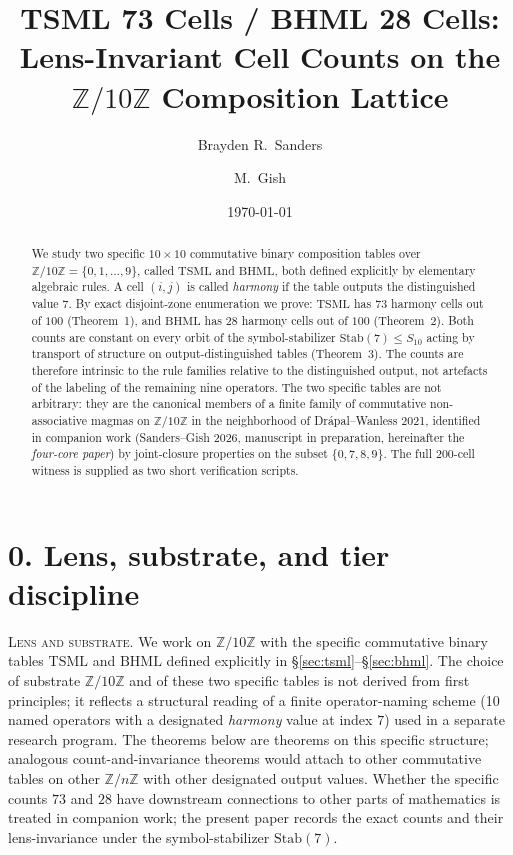 \documentclass[11pt,reqno]{amsart}
\title[TSML 73 / BHML 28 cells on $\Zten$]
  {TSML 73 Cells / BHML 28 Cells:\\
   Lens-Invariant Cell Counts on the\\
   $\mathbb{Z}/10\mathbb{Z}$ Composition Lattice}
\author{Brayden R.\ Sanders}
\author{M.\ Gish}
\date{\today}
\theoremstyle{plain}
\theoremstyle{definition}
\theoremstyle{remark}
\newcommand{\Z}{\mathbb{Z}}
\newcommand{\Zten}{\Z/10\Z}
\newcommand{\TSML}{\mathrm{TSML}}
\newcommand{\BHML}{\mathrm{BHML}}
\begin{document}
\begin{abstract}
We study two specific $10\times10$ commutative binary composition
tables over $\Zten = \{0, 1, \ldots, 9\}$, called $\TSML$ and
$\BHML$, both defined explicitly by elementary algebraic rules. A
cell $(i, j)$ is called \emph{harmony} if the table outputs the
distinguished value $7$. By exact disjoint-zone enumeration we
prove: $\TSML$ has $73$ harmony cells out of $100$ (Theorem~1), and
$\BHML$ has $28$ harmony cells out of $100$ (Theorem~2). Both
counts are constant on every orbit of the symbol-stabilizer
$\mathrm{Stab}(7) \le S_{10}$ acting by transport of structure on
output-distinguished tables (Theorem~3). The counts are therefore
intrinsic to the rule families relative to the distinguished
output, not artefacts of the labeling of the remaining nine
operators. The two specific tables are not arbitrary: they are the
canonical members of a finite family of commutative non-associative
magmas on $\Zten$ in the neighborhood of Dr\'apal--Wanless 2021,
identified in companion work (Sanders--Gish 2026, manuscript in
preparation, hereinafter the \emph{four-core paper}) by joint-closure
properties on the subset $\{0, 7, 8, 9\}$. The full $200$-cell
witness is supplied as two short verification scripts.
\end{abstract}

\maketitle

\section*{0. Lens, substrate, and tier discipline}

\noindent
\textsc{Lens and substrate.}
We work on $\Zten$ with the specific commutative binary tables
$\TSML$ and $\BHML$ defined explicitly in
\S\ref{sec:tsml}--\S\ref{sec:bhml}. The choice of substrate $\Zten$
and of these two specific tables is not derived from first
principles; it reflects a structural reading of a finite
operator-naming scheme (10 named operators with a designated
\emph{harmony} value at index $7$) used in a separate research
program. The theorems below are theorems on this specific
structure; analogous count-and-invariance theorems would attach to
other commutative tables on other $\Z/n\Z$ with other designated
output values. Whether the specific counts $73$ and $28$ have
downstream connections to other parts of mathematics is treated in
companion work; the present paper records the exact counts and
their lens-invariance under the symbol-stabilizer $\mathrm{Stab}(7)$.
\end{document}
